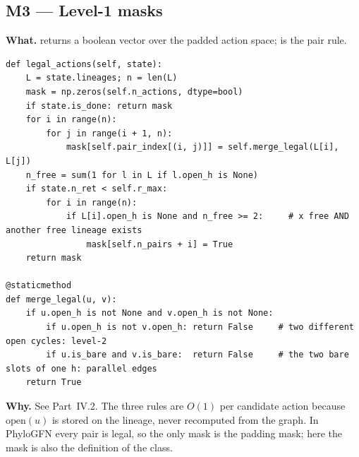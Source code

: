 \subsection{M3 --- Level-1 masks}
\textbf{What.}  returns a boolean vector over the padded action space;  is the pair rule.
\begin{lstlisting}
def legal_actions(self, state):
    L = state.lineages; n = len(L)
    mask = np.zeros(self.n_actions, dtype=bool)
    if state.is_done: return mask
    for i in range(n):
        for j in range(i + 1, n):
            mask[self.pair_index[(i, j)]] = self.merge_legal(L[i], L[j])
    n_free = sum(1 for l in L if l.open_h is None)
    if state.n_ret < self.r_max:
        for i in range(n):
            if L[i].open_h is None and n_free >= 2:     # x free AND another free lineage exists
                mask[self.n_pairs + i] = True
    return mask

@staticmethod
def merge_legal(u, v):
    if u.open_h is not None and v.open_h is not None:
        if u.open_h is not v.open_h: return False     # two different open cycles: level-2
        if u.is_bare and v.is_bare:  return False     # the two bare slots of one h: parallel edges
    return True
\end{lstlisting}
\textbf{Why.} See Part~IV.2. The three rules are $O(1)$ per candidate action because $\mathrm{open}(u)$ is stored on the lineage, never recomputed from the graph. In PhyloGFN every pair is legal, so the only mask is the padding mask; here the mask is also the definition of the class.

